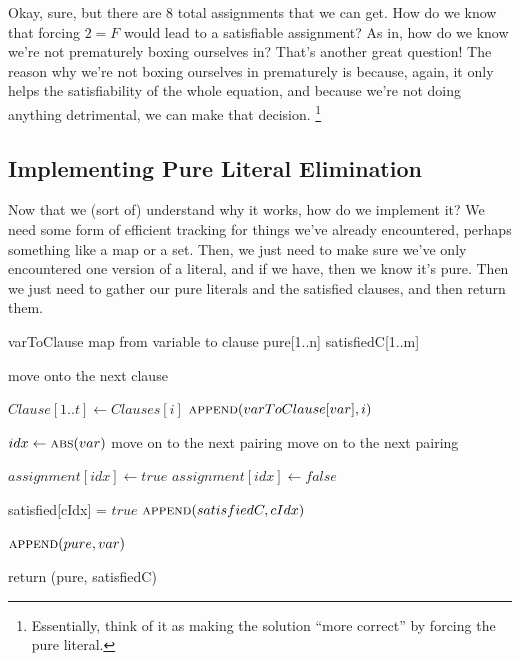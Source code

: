 Okay, sure, but there are 8 total assignments that we can get. How do we know that forcing 
$2 = F$ would lead to a satisfiable assignment? As in, how do we know we're not prematurely 
boxing ourselves in? That's another great question! The reason why we're not boxing ourselves 
in prematurely is because, again, it only helps the satisfiability of the whole equation, 
and because we're not doing anything detrimental, we can make that decision.
\footnote{Essentially, think of it as making the solution ``more correct'' 
by forcing the pure literal.}

\subsection{Implementing Pure Literal Elimination}

Now that we (sort of) understand why it works, how do we implement it?
We need some form of efficient tracking for things we've already encountered, perhaps 
something like a map or a set. Then, we just need to make sure we've only encountered 
one version of a literal, and if we have, then we know it's pure. Then we just need 
to gather our pure literals and the satisfied clauses, and then return them. 

\begin{algorithm}[H]
\caption{Pure Literal Elimination}\label{alg:15}
\begin{algorithmic}[1]


\State varToClause \Comment map from variable to clause
\State pure[1..n]
\State satisfiedC[1..m]

        \State move onto the next clause
    \EndIf

    \State $Clause[1..t] \gets Clauses[i]$
        \State $\Call{append}{varToClause[var], i}$
    \EndFor
\EndFor

    \State $idx \gets \Call{abs}{var}$
        \State move on to the next pairing
        \State move on to the next pairing
    \EndIf

        \State $assignment[idx] \gets true$
    \Else
        \State $assignment[idx] \gets false$
    \EndIf

        \State satisfied[cIdx] = $true$
        \State $\Call{append}{satisfiedC, cIdx}$
    \EndFor

    $\Call{append}{pure, var}$
\EndFor

\State return (pure, satisfiedC)

\EndProcedure
\end{algorithmic}
\end{algorithm}

